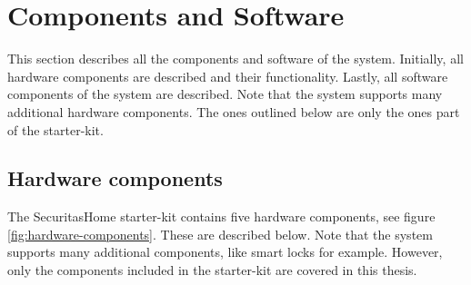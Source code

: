 \section{Components and Software} \label{ch:system:components}
This section describes all the components and software of the system. Initially, all hardware components are described and their functionality. Lastly, all software components of the system are described. Note that the system supports many additional hardware components. The ones outlined below are only the ones part of the starter-kit.

\subsection{Hardware components} \label{ch:system:hardware}
The SecuritasHome starter-kit contains five hardware components, see figure \ref{fig:hardware-components}. These are described below. Note that the system supports many additional components, like smart locks for example. However, only the components included in the starter-kit are covered in this thesis.
